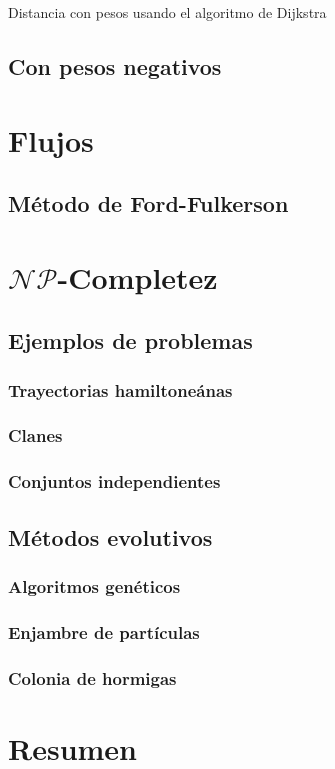\begin{algorithm}
  \caption[Dijsktra]{
    Distancia con pesos usando el algoritmo de Dijkstra
  }
  \label{alg:dijkstra}
  \begin{algorithmic}[1]
  \end{algorithmic}
\end{algorithm}
\subsection{Con pesos negativos}

\section{Flujos}

\subsection{Método de Ford-Fulkerson}

\section{$\mathcal{NP}$-Completez}

\subsection{Ejemplos de problemas}

\subsubsection{Trayectorias hamiltoneánas}

\subsubsection{Clanes}

\subsubsection{Conjuntos independientes}

\subsection{Métodos evolutivos}

\subsubsection{Algoritmos genéticos}

\subsubsection{Enjambre de partículas}

\subsubsection{Colonia de hormigas}

\section{Resumen}
